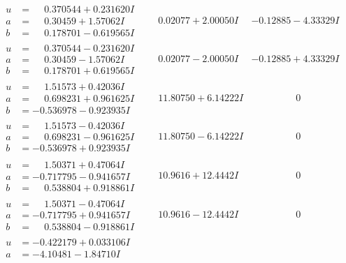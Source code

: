 \documentclass[1p]{elsarticle_modified}
\theoremstyle{definition}
\begin{document}
$$\begin{array}{c|c|c}
 \hline 
\begin{aligned}
u &= \phantom{-}0.370544 + 0.231620 I \\
a &= \phantom{-}0.30459 + 1.57062 I \\
b &= \phantom{-}0.178701 - 0.619565 I\end{aligned}
 & \phantom{-}0.02077 + 2.00050 I & -0.12885 - 4.33329 I \\ \hline\begin{aligned}
u &= \phantom{-}0.370544 - 0.231620 I \\
a &= \phantom{-}0.30459 - 1.57062 I \\
b &= \phantom{-}0.178701 + 0.619565 I\end{aligned}
 & \phantom{-}0.02077 - 2.00050 I & -0.12885 + 4.33329 I \\ \hline\begin{aligned}
u &= \phantom{-}1.51573 + 0.42036 I \\
a &= \phantom{-}0.698231 + 0.961625 I \\
b &= -0.536978 - 0.923935 I\end{aligned}
 & \phantom{-}11.80750 + 6.14222 I & \phantom{-0.000000 } 0 \\ \hline\begin{aligned}
u &= \phantom{-}1.51573 - 0.42036 I \\
a &= \phantom{-}0.698231 - 0.961625 I \\
b &= -0.536978 + 0.923935 I\end{aligned}
 & \phantom{-}11.80750 - 6.14222 I & \phantom{-0.000000 } 0 \\ \hline\begin{aligned}
u &= \phantom{-}1.50371 + 0.47064 I \\
a &= -0.717795 - 0.941657 I \\
b &= \phantom{-}0.538804 + 0.918861 I\end{aligned}
 & \phantom{-}10.9616 + 12.4442 I & \phantom{-0.000000 } 0 \\ \hline\begin{aligned}
u &= \phantom{-}1.50371 - 0.47064 I \\
a &= -0.717795 + 0.941657 I \\
b &= \phantom{-}0.538804 - 0.918861 I\end{aligned}
 & \phantom{-}10.9616 - 12.4442 I & \phantom{-0.000000 } 0 \\ \hline\begin{aligned}
u &= -0.422179 + 0.033106 I \\
a &= -4.10481 - 1.84710 I \\

\end{aligned}
\end{array}$$
\end{document}
